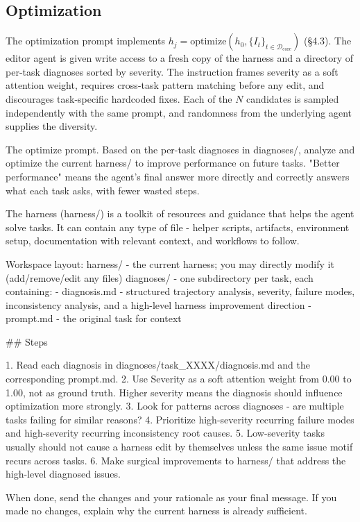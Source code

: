 \subsection{Optimization}

The optimization prompt implements
$h_j = \mathrm{optimize}(h_0, \{I_t\}_{t \in \mathcal{D}_{\mathrm{core}}})$
(\S 4.3). The editor agent is given write access to a fresh copy of
the harness and a directory of per-task diagnoses sorted by severity.
The instruction frames severity as a soft attention weight, requires
cross-task pattern matching before any edit, and discourages
task-specific hardcoded fixes. Each of the $N$ candidates is sampled
independently with the same prompt, and randomness from the underlying
agent supplies the diversity.

\begin{promptbox}{The $\mathrm{optimize}$ prompt.}
Based on the per-task diagnoses in diagnoses/, analyze and optimize the current harness/ to improve performance on future tasks. "Better performance" means the agent's final answer more directly and correctly answers what each task asks, with fewer wasted steps.

The harness (harness/) is a toolkit of resources and guidance that helps the agent solve tasks. It can contain any type of file - helper scripts, artifacts, environment setup, documentation with relevant context, and workflows to follow.

Workspace layout:
  harness/       - the current harness; you may directly modify it (add/remove/edit any files)
  diagnoses/     - one subdirectory per task, each containing:
    - diagnosis.md  - structured trajectory analysis, severity, failure modes, inconsistency analysis, and a high-level harness improvement direction
    - prompt.md     - the original task for context

## Steps

1. Read each diagnosis in diagnoses/task_XXXX/diagnosis.md and the corresponding prompt.md.
2. Use Severity as a soft attention weight from 0.00 to 1.00, not as ground truth. Higher severity means the diagnosis should influence optimization more strongly.
3. Look for patterns across diagnoses - are multiple tasks failing for similar reasons?
4. Prioritize high-severity recurring failure modes and high-severity recurring inconsistency root causes.
5. Low-severity tasks usually should not cause a harness edit by themselves unless the same issue motif recurs across tasks.
6. Make surgical improvements to harness/ that address the high-level diagnosed issues.

When done, send the changes and your rationale as your final message. If you made no changes, explain why the current harness is already sufficient.
\end{promptbox}

